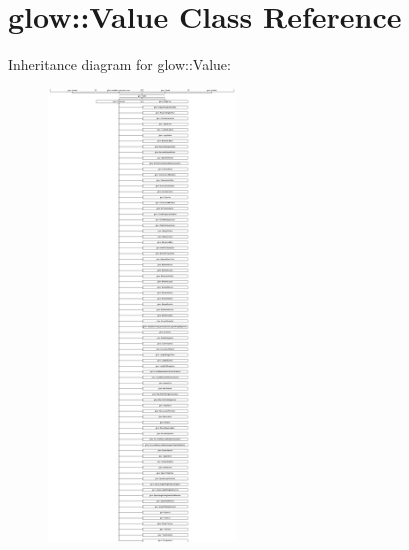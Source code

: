 \hypertarget{classglow_1_1_value}{}\section{glow\+:\+:Value Class Reference}
\label{classglow_1_1_value}
Inheritance diagram for glow\+:\+:Value\+:\begin{figure}[H]
\begin{center}
\leavevmode
\includegraphics[height=12.000000cm]{classglow_1_1_value}
\end{center}
\end{figure}
